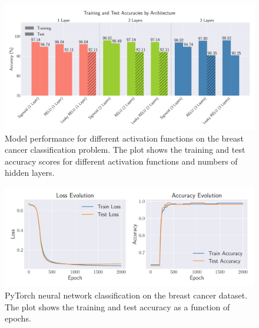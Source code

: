 \documentclass[aps,pra,english,notitlepage,reprint,nofootinbib]{revtex4-1}  %
\begin{document}
\begin{onecolumngrid}
    \begin{figure}[h!]
        \centering
        \includegraphics[width = .9\textwidth]{../figs/classification_activations_layers.pdf}
        \caption{Model performance for different activation functions on the breast cancer classification problem. The plot shows the training and test accuracy scores for different activation functions and numbers of hidden layers.}
        \label{fig:NN_Classification_activations_layers}
    \end{figure}
\end{onecolumngrid}

\begin{onecolumngrid}
    \begin{figure}[h!]
        \centering
        \includegraphics[width =.9\textwidth]{../figs/nn_torch_breast_cancer.pdf}
        \caption{PyTorch neural network classification on the breast cancer dataset. The plot shows the training and test accuracy as a function of epochs.}
        \label{fig:NN_Torch_breast_cancer}
    \end{figure}
\end{onecolumngrid}
\end{document}
